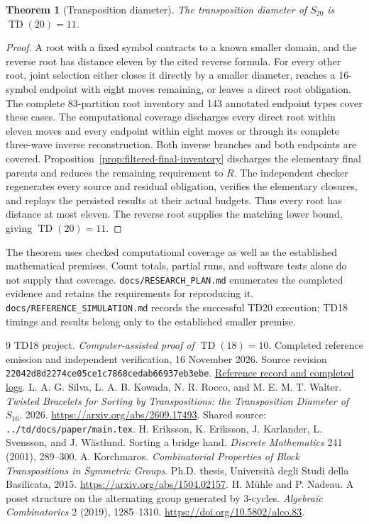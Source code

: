 \documentclass[11pt,a4paper]{article}
\newcommand{\TD}{\operatorname{TD}}
\newtheorem{theorem}{Theorem}
\begin{document}
\begin{theorem}[Transposition diameter]
\label{thm:td20}
The transposition diameter of $S_{20}$ is $\TD(20)=11$.
\end{theorem}
\begin{proof}
A root with a fixed symbol contracts to a known smaller domain, and the reverse
root has distance eleven by the cited reverse formula. For every other root, joint
selection either closes it directly by a smaller diameter, reaches a 16-symbol
endpoint with eight moves remaining, or leaves a direct root obligation.
The complete 83-partition root inventory and 143 annotated endpoint types cover
these cases. The computational coverage discharges every direct root within eleven
moves and every endpoint within eight moves or through its complete three-wave
inverse reconstruction. Both inverse branches and both endpoints are covered.
Proposition~\ref{prop:filtered-final-inventory} discharges the elementary
final parents and reduces the remaining requirement to $R$. The independent
checker regenerates every source and residual obligation, verifies the
elementary closures, and replays the persisted results at their actual
budgets. Thus every root has distance at most eleven.
The reverse root supplies the matching lower bound, giving $\TD(20)=11$.
\end{proof}

The theorem uses checked computational coverage as well as the established
mathematical premises. Count totals, partial runs, and software tests alone do
not supply that coverage. \nolinkurl{docs/RESEARCH_PLAN.md} enumerates the
completed evidence and retains the requirements for reproducing it.
\nolinkurl{docs/REFERENCE_SIMULATION.md} records the successful TD20 execution;
TD18 timings and results belong only to the established smaller premise.

\begin{thebibliography}{9}
TD18 project. \emph{Computer-assisted proof of $\TD(18)=10$}.
Completed reference emission and independent verification, 16 November 2026.
Source revision \nolinkurl{22042d8d2274ce05ce1c7868cedab66937eb3ebe}.
\href{https://github.com/luizaugustogarcia/td18/blob/22042d8d2274ce05ce1c7868cedab66937eb3ebe/docs/REFERENCE_SIMULATION.md}
{Reference record and completed logs}.
L. A. G. Silva, L. A. B. Kowada, N. R. Rocco, and M. E. M. T. Walter.
\emph{Twisted Bracelets for Sorting by Transpositions: the Transposition
Diameter of $S_{16}$}. 2026.
\url{https://arxiv.org/abs/2609.17493}.
Shared source: \nolinkurl{../td/docs/paper/main.tex}.
H. Eriksson, K. Eriksson, J. Karlander, L. Svensson, and J. W\"astlund.
Sorting a bridge hand. \emph{Discrete Mathematics} 241 (2001), 289--300.
A. Korchmaros. \emph{Combinatorial Properties of Block Transpositions in
Symmetric Groups}. Ph.D. thesis, Universit\`a degli Studi della Basilicata,
2015. \url{https://arxiv.org/abs/1504.02157}.
H. M\"uhle and P. Nadeau. A poset structure on the alternating group
generated by $3$-cycles. \emph{Algebraic Combinatorics} 2 (2019), 1285--1310.
\url{https://doi.org/10.5802/alco.83}.
\end{thebibliography}
\end{document}
